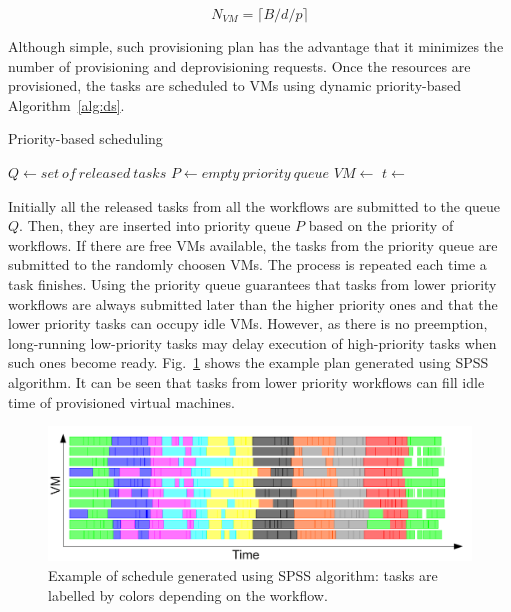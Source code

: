 \documentclass{sig-alternate}
\begin{document}
\begin{equation}
\label{eq:static-plan}
N_{VM} = \lceil B / d / p \rceil
\end{equation}

Although simple, such provisioning plan has the advantage that it
minimizes the number of provisioning and deprovisioning requests.
Once the resources are provisioned, the tasks are scheduled to VMs using dynamic
priority-based Algorithm~\ref{alg:ds}. 

\begin{algorithm}
\caption{Priority-based scheduling}
\label{alg:ds}
\begin{algorithmic}[1]
    \State $Q\gets set\ of\ released\ tasks$
    \State $P\gets empty\ priority\ queue$
    		\State {} 
    	\EndFor
    		\State $VM\gets$ 
    		\State $t\gets$ 
    		\State {}
    	\EndWhile
    	\State {}
    	\State {}
    \EndWhile
\EndProcedure
\end{algorithmic} 
\end{algorithm}

Initially all the
released tasks from all the workflows are submitted to the queue $Q$. Then, they
are inserted into priority queue $P$ based on the priority of workflows. If
there are free VMs available, the tasks from the priority queue are submitted to
the randomly choosen VMs. The process is repeated each time a task finishes.
Using the priority queue guarantees that tasks from lower priority workflows are
always submitted later than the higher priority ones and that the lower priority
tasks can occupy idle VMs. However, as there is no preemption, long-running
low-priority tasks may delay execution of high-priority tasks when such ones
become ready. Fig.~\ref{fig:spss-example} shows the example plan generated using
SPSS algorithm. It can be seen that tasks from lower priority workflows can fill
idle time of provisioned virtual machines.

\begin{figure}[htb] 
\centering
\includegraphics[width=1.0\columnwidth]{figures/spds-gantt}
 \caption{Example of schedule generated using SPSS algorithm: tasks are labelled
 by colors depending on the workflow. }
\label{fig:spss-example}
\end{figure}
\end{document}
